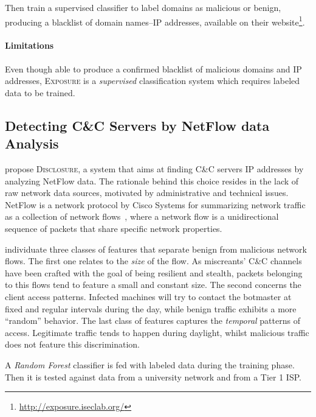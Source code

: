 Then \citet{bilge2011exposure} train a supervised classifier to label domains as
malicious or benign, producing a blacklist of domain names--IP addresses, available
on their website\footnote{\url{http://exposure.iseclab.org/}}.

\paragraph{Limitations}
Even though able to produce a confirmed blacklist of malicious domains and IP addresses,
\textsc{Exposure} is a \emph{supervised} classification system which requires labeled data to be trained.

\subsection{Detecting C\&C Servers by NetFlow data Analysis} %
\label{sub:disclosure}
\citet{bilge2012} propose \textsc{Disclosure}, a system that aims at finding C\&C
servers IP addresses by analyzing NetFlow data. The rationale behind this choice
resides in the lack of raw network data sources, motivated by administrative
and technical issues.
NetFlow is a network protocol by Cisco Systems for summarizing network
traffic as a collection of network flows~\cite{bilge2012}, where a network flow is
a unidirectional sequence of packets that share specific network properties.

\citet{bilge2012} individuate three classes of features that separate benign from
malicious network flows. The first one relates to the \emph{size} of the flow.
As miscreants' C\&C channels have been crafted with the goal of being resilient and
stealth, packets belonging to this flows tend to feature a small and constant size.
The second concerns the client access patterns. Infected machines will try to
contact the botmaster at fixed and regular intervals during the day, while benign
traffic exhibits a more ``random'' behavior. The last class of features captures the
\emph{temporal} patterns of access. Legitimate traffic tends to happen during
daylight, whilst malicious traffic does not feature this discrimination.

A \emph{Random Forest} classifier is fed with labeled data during the training
phase. Then it is tested against data from a university network and from a Tier 1
ISP.

